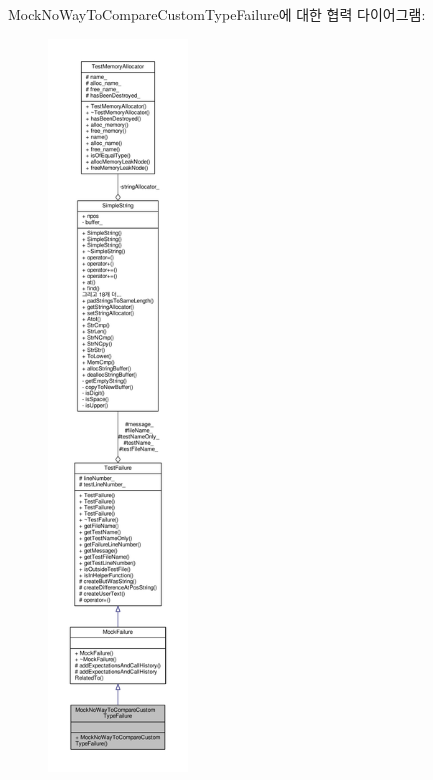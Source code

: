 Mock\+No\+Way\+To\+Compare\+Custom\+Type\+Failure에 대한 협력 다이어그램\+:
\nopagebreak
\begin{figure}[H]
\begin{center}
\leavevmode
\includegraphics[height=550pt]{class_mock_no_way_to_compare_custom_type_failure__coll__graph}
\end{center}
\end{figure}
